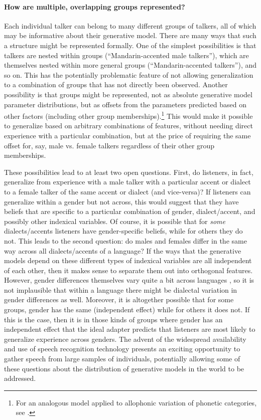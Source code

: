 \paragraph{How are multiple, overlapping groups represented?}
\label{sec:what-repr-are}

\label{r1-features-classes}
Each individual talker can belong to many different groups of talkers, all of which may be informative about their generative model.  There are many ways that such a structure might be represented formally.  One of the simplest possibilities is that talkers are nested within groups (``Mandarin-accented male talkers''), which are themselves nested within more general groups (``Mandarin-accented talkers''), and so on.  This has the potentially problematic feature of not allowing generalization to a combination of groups that has not directly been observed.  Another possibility is that groups might be represented, not as absolute generative model parameter distributions, but as offsets from the parameters predicted based on other factors (including other group memberships).\footnote{For an analogous model applied to allophonic variation of phonetic categories, see \textcite{Dillon2013}.}  This would make it possible to generalize based on arbitrary combinations of features, without needing direct experience with a particular combination, but at the price of requiring the same offset for, say, male vs. female talkers regardless of their other group memberships.  

These possibilities lead to at least two open questions. First, do listeners, in fact, generalize from experience with a male talker with a particular accent or dialect to a female talker of the same accent or dialect (and vice-versa)?  If listeners can generalize within a gender but not across, this would suggest that they have beliefs that are specific to a particular combination of gender, dialect/accent, and possibly other indexical variables.  Of course, it is possible that for \emph{some} dialects/accents listeners have gender-specific beliefs, while for others they do not.  This leads to the second question: do males and females differ in the same way across all dialects/accents of a language?  If the ways that the generative models depend on these different types of indexical variables are all independent of each other, then it makes sense to separate them out into orthogonal features.  However, gender differences themselves vary quite a bit across languages \autocite{Johnson2006}, so it is not implausible that within a language there might be dialectal variation in gender differences as well.  Moreover, it is altogether possible that for some groups, gender has the same (independent effect) while for others it does not.  If this is the case, then it is in those kinds of groups where gender has an independent effect that the ideal adapter predicts that listeners are most likely to generalize experience across genders. The advent of the widespread availability and use of speech recognition technology presents an exciting opportunity to gather speech from large samples of individuals, potentially allowing some of these questions about the distribution of generative models in the world to be addressed.

